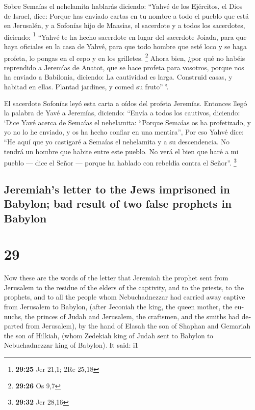 \begin{paracol}{2}
 Sobre Semaías el nehelamita hablarás diciendo:
 ``Yahvé de los Ejércitos, el Dios de Israel, dice:
Porque has enviado cartas en tu nombre a todo el pueblo que está en
Jerusalén, y a Sofonías hijo de Maasías, el sacerdote y a todos los
sacerdotes, diciendo: \footnote{\textbf{29:25} Jer 21,1; 2Re 25,18}
 ``Yahvé te ha hecho sacerdote en lugar del sacerdote
Joiada, para que haya oficiales en la casa de Yahvé, para que todo
hombre que esté loco y se haga profeta, lo pongas en el cepo y en los
grilletes. \footnote{\textbf{29:26} Os 9,7}  Ahora bien,
¿por qué no habéis reprendido a Jeremías de Anatot, que se hace profeta
para vosotros,  porque nos ha enviado a Babilonia,
diciendo: La cautividad es larga. Construid casas, y habitad en ellas.
Plantad jardines, y comed su fruto''\,''.

 El sacerdote Sofonías leyó esta carta a oídos del
profeta Jeremías.  Entonces llegó la palabra de Yavé a
Jeremías, diciendo:  ``Envía a todos los cautivos,
diciendo: `Dice Yavé acerca de Semaías el nehelamita: ``Porque Semaías
os ha profetizado, y yo no lo he enviado, y os ha hecho confiar en una
mentira'',  Por eso Yahvé dice: ``He aquí que yo
castigaré a Semaías el nehelamita y a su descendencia. No tendrá un
hombre que habite entre este pueblo. No verá el bien que haré a mi
pueblo --- dice el Señor --- porque ha hablado con rebeldía contra el
Señor''. \footnote{\textbf{29:32} Jer 28,16}

\switchcolumn
\begin{otherlanguage}{english}

\hypertarget{jeremiahs-letter-to-the-jews-imprisoned-in-babylon-bad-result-of-two-false-prophets-in-babylon}{%
\subsection{Jeremiah's letter to the Jews imprisoned in Babylon; bad
result of two false prophets in
Babylon}\label{jeremiahs-letter-to-the-jews-imprisoned-in-babylon-bad-result-of-two-false-prophets-in-babylon}}

\hypertarget{section-57}{%
\section{29}\label{section-57}}

 Now these are the words of the letter that Jeremiah the
prophet sent from Jerusalem to the residue of the elders of the
captivity, and to the priests, to the prophets, and to all the people
whom Nebuchadnezzar had carried away captive from Jerusalem to Babylon,
 (after Jeconiah the king, the queen mother, the eunuchs,
the princes of Judah and Jerusalem, the craftsmen, and the smiths had
departed from Jerusalem),  by the hand of Elasah the son
of Shaphan and Gemariah the son of Hilkiah, (whom Zedekiah king of Judah
sent to Babylon to Nebuchadnezzar king of Babylon). It said: i1


\end{otherlanguage}
\end{paracol}
